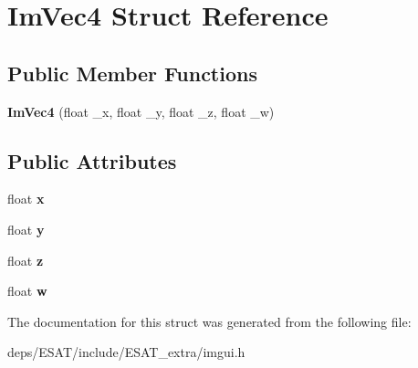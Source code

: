 \hypertarget{struct_im_vec4}{}\section{Im\+Vec4 Struct Reference}
\label{struct_im_vec4}
\subsection*{Public Member Functions}
\begin{DoxyCompactItemize}
\item 
\mbox{\label{struct_im_vec4_af9e535f36b0fc7b9af0f60951fb4ffe4}} 
{\bfseries Im\+Vec4} (float \+\_\+x, float \+\_\+y, float \+\_\+z, float \+\_\+w)
\end{DoxyCompactItemize}
\subsection*{Public Attributes}
\begin{DoxyCompactItemize}
\item 
\mbox{\label{struct_im_vec4_a2090f651f5e5b78fedae8dab87343db6}} 
float {\bfseries x}
\item 
\mbox{\label{struct_im_vec4_a6b4d00ae261be4fe54353c759c561fe7}} 
float {\bfseries y}
\item 
\mbox{\label{struct_im_vec4_aba6a75356917a28c967954bb29133a1a}} 
float {\bfseries z}
\item 
\mbox{\label{struct_im_vec4_afeed5acd9f0d2043175f4da229d12a38}} 
float {\bfseries w}
\end{DoxyCompactItemize}


The documentation for this struct was generated from the following file\+:\begin{DoxyCompactItemize}
\item 
deps/\+E\+S\+A\+T/include/\+E\+S\+A\+T\+\_\+extra/imgui.\+h\end{DoxyCompactItemize}
